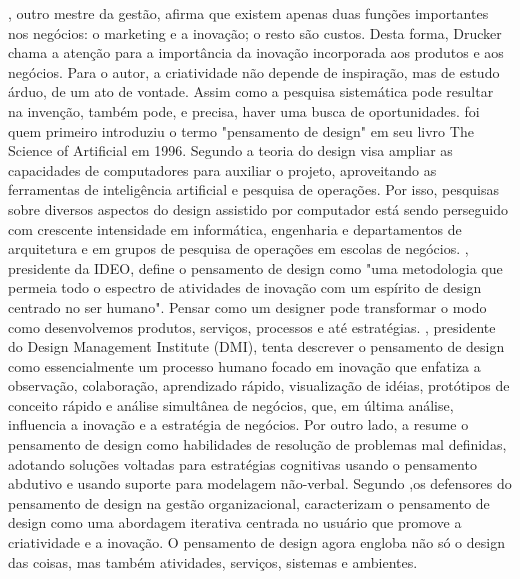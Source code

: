 \documentclass[twoside,twocolumn]{article}
\begin{document}
\newline \indent \citep{Drucker1986}, outro mestre da gestão, afirma que existem apenas duas funções importantes nos negócios: o marketing e a inovação; o resto são custos. Desta forma, Drucker chama a atenção para a importância da inovação incorporada aos produtos e aos negócios. Para o autor, a criatividade não depende de inspiração, mas de estudo árduo, de um ato de vontade. Assim como a pesquisa sistemática pode resultar na invenção, também pode, e precisa, haver uma busca de oportunidades.
\newline \indent \citep{Simon1996} foi quem primeiro introduziu o termo "pensamento de design" em seu livro The Science of Artificial em 1996. Segundo \citep{Simon1996} a teoria do design visa ampliar as capacidades de computadores para auxiliar o projeto, aproveitando as ferramentas de inteligência artificial e pesquisa de operações. Por isso, pesquisas sobre diversos aspectos do design assistido por computador está sendo perseguido com crescente intensidade em informática, engenharia e departamentos de arquitetura e em grupos de pesquisa de operações em escolas de negócios.
\newline \indent \citep{Brown2008}, presidente da IDEO, define o pensamento de design como "uma metodologia que permeia todo o espectro de atividades de inovação com um espírito de design centrado no ser humano". Pensar como um designer pode transformar o modo como desenvolvemos produtos, serviços, processos e até estratégias.
\newline \indent \citep{Thomas2017} , presidente do Design Management Institute (DMI), tenta descrever o pensamento de design como essencialmente um processo humano focado em inovação que enfatiza a observação, colaboração, aprendizado rápido, visualização de idéias, protótipos de conceito rápido e análise simultânea de negócios, que, em última análise, influencia a inovação e a estratégia de negócios.
\newline \indent Por outro lado, a \citep{Cross2011} resume o pensamento de design como  habilidades de resolução de problemas mal definidas, adotando soluções voltadas para estratégias cognitivas usando o pensamento abdutivo e usando suporte para modelagem não-verbal.
\newline \indent Segundo \citep{Cross2011} ,os defensores do pensamento de design na gestão organizacional, caracterizam o pensamento de design como uma abordagem iterativa centrada no usuário que promove a criatividade e a inovação. O pensamento de design agora engloba não só o design das coisas, mas também atividades, serviços, sistemas e ambientes.
\end{document}
